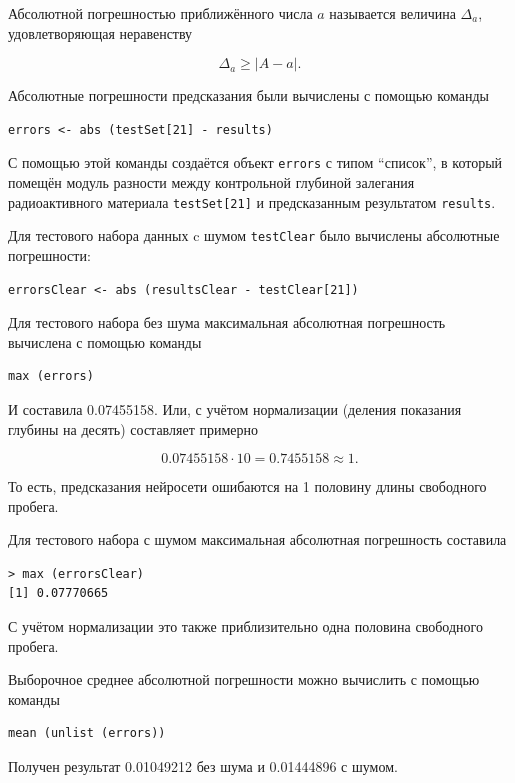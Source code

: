 \documentclass[12pt]{article}
\begin{document}
Абсолютной погрешностью приближённого числа $a$ называется величина $\Delta_a$, удовлетворяющая неравенству

$$\Delta_a \ge |A - a|.$$

Абсолютные погрешности предсказания были вычислены с помощью команды

\begin{verbatim}
errors <- abs (testSet[21] - results)
\end{verbatim}

С помощью этой команды создаётся объект \verb|errors| с типом ``список'', в который помещён модуль разности между контрольной глубиной залегания радиоактивного материала \verb|testSet[21]| и предсказанным результатом \verb|results|.

Для тестового набора данных c шумом \verb|testClear| было вычислены абсолютные погрешности:

\begin{verbatim}
errorsClear <- abs (resultsClear - testClear[21])
\end{verbatim}

Для тестового набора без шума максимальная абсолютная погрешность вычислена с помощью команды

\begin{verbatim}
max (errors)
\end{verbatim}

И составила 0.07455158. Или, с учётом нормализации (деления показания глубины на десять) составляет примерно

$$0.07455158 \cdot 10 = 0.7455158 \approx 1.$$

То есть, предсказания нейросети ошибаются на 1 половину длины свободного пробега.

Для тестового набора с шумом максимальная абсолютная погрешность составила

\begin{verbatim}
> max (errorsClear)
[1] 0.07770665
\end{verbatim}

С учётом нормализации это также приблизительно одна половина свободного пробега.


Выборочное среднее абсолютной погрешности можно вычислить с помощью команды

\begin{verbatim}
mean (unlist (errors))
\end{verbatim}

Получен результат 0.01049212 без шума и 0.01444896 с шумом.
\end{document}
